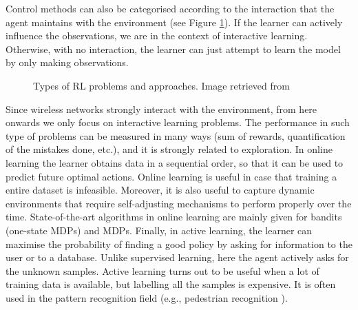 \documentclass[12pt, a4paper,twoside]{tesi_upf}
\begin{document}
			Control methods can also be categorised according to the interaction that the agent maintains with the environment (see Figure \ref{fig:rl_control_types}). If the learner can actively influence the observations, we are in the context of interactive learning. Otherwise, with no interaction, the learner can just attempt to learn the model by only making observations.
			\begin{figure}[h!]
				\centering
				\caption{Types of RL problems and approaches. Image retrieved from \cite{szepesvari2010algorithms}}
				\label{fig:rl_control_types}
			\end{figure}
			
			Since wireless networks strongly interact with the environment, from here onwards we only focus on interactive learning problems. The performance in such type of problems can be measured in many ways (sum of rewards, quantification of the mistakes done, etc.), and it is strongly related to exploration. In online learning the learner obtains data in a sequential order, so that it can be used to predict future optimal actions. Online learning is useful in case that training a entire dataset is infeasible. Moreover, it is also useful to capture dynamic environments that require self-adjusting mechanisms to perform properly over the time. State-of-the-art algorithms in online learning are mainly given for bandits (one-state MDPs) and MDPs. Finally, in active learning, the learner can maximise the probability of finding a good policy by asking for information to the user or to a database. Unlike supervised learning, here the agent actively asks for the unknown samples. Active learning turns out to be useful when a lot of training data is available, but labelling all the samples is expensive. It is often used in the pattern recognition field (e.g., pedestrian recognition \cite{abramson2004active}).
					
\end{document}
